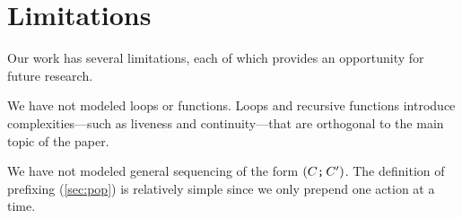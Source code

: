 



\section{Limitations}
\label{sec:limits}


 Our work has several limitations, each of which provides an opportunity for
future research.  %

We have not modeled loops or functions.  Loops and recursive functions
introduce complexities\allowbreak{}---such as liveness and continuity---that
are orthogonal to the main topic of the paper.

We have not modeled general sequencing of the form $(C\texttt{;}\,\allowbreak C')$.  The
definition of prefixing (\textsection\ref{sec:pop}) is relatively simple
since we only prepend one action at a time.

